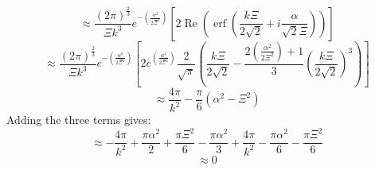 \documentclass[double,12pt]{beavtex}
\begin{document}
\begin{displaymath}{\approx\frac{\left(2\pi\right)^\frac{2}{3}}{\Xi{k}^3}e^{-\left(\frac{\alpha^2}{2\Xi^2}\right)}\left[2\operatorname{Re}\left(\operatorname{erf}\left(\frac{k\Xi}{2\sqrt{2}}+i\frac{\alpha}{\sqrt{2}\Xi}\right)\right)\right]}\end{displaymath} 
\begin{displaymath}{\approx\frac{\left(2\pi\right)^\frac{2}{3}}{\Xi{k}^3}e^{-\left(\frac{\alpha^2}{2\Xi^2}\right)}\left[2e^{\left(\frac{\alpha^2}{2\Xi^2}\right)}\frac{2}{\sqrt{\pi}}   \left(\frac{k\Xi}{2\sqrt{2}}   -\frac{2\left(\frac{\alpha^2}{2\Xi^2}\right)+1}{3}\left(\frac{k\Xi}{2\sqrt{2}}\right)^3\right)\right]}\end{displaymath}
\begin{displaymath}{\approx\frac{4\pi}{k^2}-\frac{\pi}{6}\left(\alpha^2-\Xi^2\right)}\end{displaymath}  
\color{black}
Adding the three terms gives:
\begin{displaymath}{\approx-\frac{4\pi}{k^2}+\frac{\pi\alpha^2}{2}+\frac{\pi\Xi^2}{6}-\frac{\pi\alpha^2}{3}+\frac{4\pi}{k^2}-\frac{\pi\alpha^2}{6}-\frac{\pi\Xi^2}{6}}\end{displaymath} 
\begin{displaymath}{\approx0}\end{displaymath} 
\[{}\]
\end{document}
